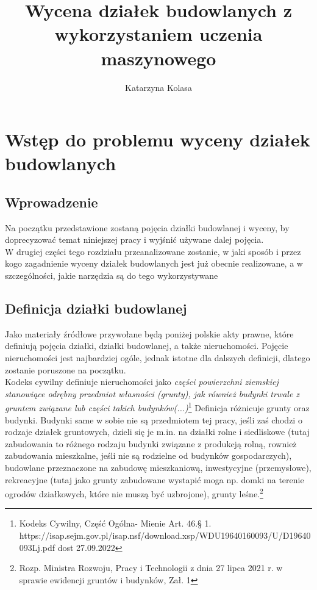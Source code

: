 \documentclass[a4paper,12pt,twoside,openany]{report}
\title{Wycena działek budowlanych z wykorzystaniem uczenia maszynowego}
\author{Katarzyna Kolasa}
\begin{document}
\maketitle

\chapter{Wstęp do problemu wyceny działek budowlanych}

\section{Wprowadzenie}
Na początku przedstawione zostaną pojęcia działki budowlanej i wyceny, by doprecyzować temat niniejszej pracy i wyjśnić używane dalej pojęcia.\\
W drugiej części tego rozdziału przeanalizowane zostanie, w jaki sposób i przez kogo zagadnienie wyceny działek budowlanych jest już obecnie realizowane, a w szczególności, jakie narzędzia są do tego wykorzystywane


\section{Definicja działki budowlanej}
Jako materiały źródłowe przywołane będą poniżej polskie akty prawne, które definiują pojęcia działki, działki budowlanej, a także nieruchomości. Pojęcie nieruchomości jest najbardziej ogóle, jednak istotne dla dalszych definicji, dlatego zostanie poruszone na początku.\\

Kodeks cywilny definiuje nieruchomości jako \textit{ części powierzchni ziemskiej stanowiące odrębny przedmiot własności (grunty), jak również budynki trwale z gruntem związane lub części takich budynków(...)}\footnote{Kodeks Cywilny, Część Ogólna- Mienie Art. 46.§ 1. https://isap.sejm.gov.pl/isap.nsf/download.xsp/WDU19640160093/U/D19640093Lj.pdf dost 27.09.2022}
Definicja różnicuje grunty oraz budynki. Budynki same w sobie nie są przedmiotem tej pracy, jeśli zaś chodzi o rodzaje działek gruntowych, dzieli się je m.in.  na działki rolne i siedliskowe (tutaj zabudowania to różnego rodzaju budynki związane z produkcją rolną, rownież zabudowania mieszkalne, jeśli nie są rodzielne od budynków gospodarczych), budowlane przeznaczone na zabudowę mieszkaniową,  inwestycyjne (przemysłowe), rekreacyjne (tutaj jako grunty zabudowane wystapić moga np. domki na terenie ogrodów działkowych, które nie muszą być uzbrojone), grunty leśne.\footnote{Rozp. Ministra Rozwoju, Pracy i Technologii z dnia 27 lipca 2021 r. w sprawie ewidencji gruntów i budynków, Zał. 1}\\
\end{document}
